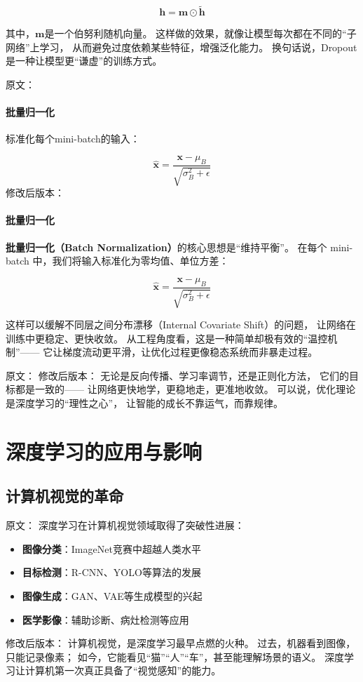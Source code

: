 $$\mathbf{h} = \mathbf{m} \odot \tilde{\mathbf{h}}$$

其中，$\mathbf{m}$是一个伯努利随机向量。  
这样做的效果，就像让模型每次都在不同的“子网络”上学习，  
从而避免过度依赖某些特征，增强泛化能力。  
换句话说，Dropout 是一种让模型更“谦虚”的训练方式。  



原文：
\paragraph{批量归一化}
标准化每个mini-batch的输入：

$$\hat{\mathbf{x}} = \frac{\mathbf{x} - \mu_B}{\sqrt{\sigma_B^2 + \epsilon}}$$
修改后版本：
\paragraph{批量归一化}  
\textbf{批量归一化（Batch Normalization）}的核心思想是“维持平衡”。  
在每个 mini-batch 中，我们将输入标准化为零均值、单位方差：  

$$\hat{\mathbf{x}} = \frac{\mathbf{x} - \mu_B}{\sqrt{\sigma_B^2 + \epsilon}}$$

这样可以缓解不同层之间分布漂移（Internal Covariate Shift）的问题，  
让网络在训练中更稳定、更快收敛。  
从工程角度看，这是一种简单却极有效的“温控机制”——  
它让梯度流动更平滑，让优化过程更像稳态系统而非暴走过程。



原文：
修改后版本：
无论是反向传播、学习率调节，还是正则化方法，  
它们的目标都是一致的——  
让网络更快地学，更稳地走，更准地收敛。  
可以说，优化理论是深度学习的“理性之心”，  
让智能的成长不靠运气，而靠规律。

\section{深度学习的应用与影响}

\subsection{计算机视觉的革命}

原文：
深度学习在计算机视觉领域取得了突破性进展：

\begin{itemize}
\item \textbf{图像分类}：ImageNet竞赛中超越人类水平
\item \textbf{目标检测}：R-CNN、YOLO等算法的发展
\item \textbf{图像生成}：GAN、VAE等生成模型的兴起
\item \textbf{医学影像}：辅助诊断、病灶检测等应用
\end{itemize}
修改后版本：
计算机视觉，是深度学习最早点燃的火种。  
过去，机器看到图像，只能记录像素；  
如今，它能看见“猫”“人”“车”，甚至能理解场景的语义。  
深度学习让计算机第一次真正具备了“视觉感知”的能力。


